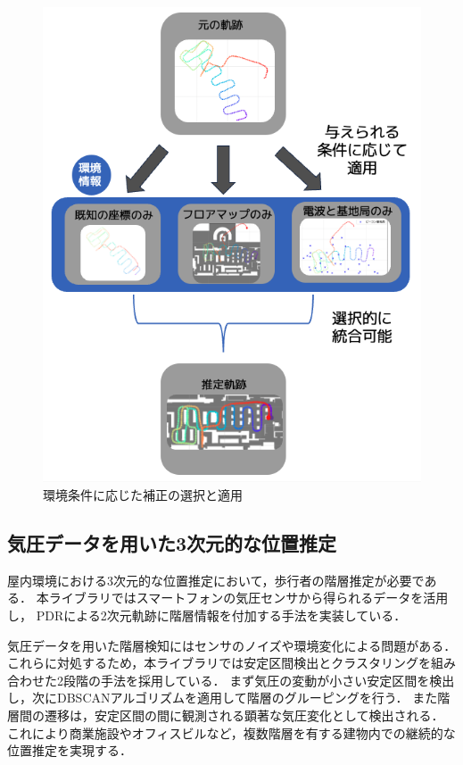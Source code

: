 \documentclass[a4paper, 10pt, twocolumn]{jarticle}
\begin{document}
\begin{figure}[h]
    \centering
    \includegraphics[width=\linewidth]{image/integrate7.jpg}
    \caption{環境条件に応じた補正の選択と適用}
    \label{fig:corrector-class}
\end{figure}


\subsection{気圧データを用いた3次元的な位置推定}
屋内環境における3次元的な位置推定において，歩行者の階層推定が必要である．
本ライブラリではスマートフォンの気圧センサから得られるデータを活用し，
PDRによる2次元軌跡に階層情報を付加する手法を実装している．

気圧データを用いた階層検知にはセンサのノイズや環境変化による問題がある．
これらに対処するため，本ライブラリでは安定区間検出とクラスタリングを組み合わせた2段階の手法を採用している．
まず気圧の変動が小さい安定区間を検出し，次にDBSCANアルゴリズムを適用して階層のグルーピングを行う．
また階層間の遷移は，安定区間の間に観測される顕著な気圧変化として検出される．
これにより商業施設やオフィスビルなど，複数階層を有する建物内での継続的な位置推定を実現する．
\end{document}
